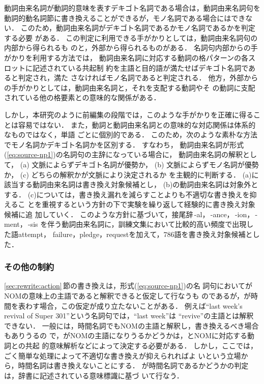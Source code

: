 動詞由来名詞が動詞的意味を表すデキゴト名詞である場合は，動詞由来名詞句を
動詞的動名詞節に書き換えることができるが，モノ名詞である場合にはできない．
このため，動詞由来名詞がデキゴト名詞であるかモノ名詞であるかを判定する必要
がある．
この判定に利用できる手がかりとしては，動詞由来名詞句の内部から得られるも
のと，外部から得られるものがある．
名詞句内部からの手がかりを利用する方法\cite{Hull96}では，
動詞由来名詞に対応する動詞の格パターンの各スロットに記述されている共起制
約を主語\NP と目的語\NPpost が満たせばデキゴト名詞であると判定され，満た
さなければモノ名詞であると判定される．
他方，外部からの手がかりとしては，動詞由来名詞と，それを支配する動詞やそ
の動詞に支配されている他の格要素との意味的な関係がある\cite{Vendler67}． 

しかし，本研究のように前編集の段階では，このような手がかりを正確に得るこ
とは容易ではない．
また，動詞と動詞由来名詞との意味的な対応関係は体系的なものではなく，単語
ごとに個別的である\cite{Ota74}．
このため，次のような素朴な方法でモノ名詞かデキゴト名詞かを区別する．
すなわち，
動詞由来名詞が形式(\ref{eq:source-np1})の名詞句の主辞になっている場合に，
動詞由来名詞の解釈として，
(a) 文脈によらずデキゴト名詞が優勢か，
(b) 文脈によらずモノ名詞が優勢か，
(c) どちらの解釈かが文脈により決定されるか
を主観的に判断する．
(a)に該当する動詞由来名詞は書き換え対象候補とし，
(b)の動詞由来名詞は対象外とする．
(c)については，書き換え漏れを減らすことよりも不適切な書き換えを抑えるこ
とを重視するという方針の下で実験を繰り返して経験的に書き換え対象候補に追
加していく．
このような方針に基づいて，接尾辞\,-al，\,-ance，\,-ion，\,-ment，\,-sis
を伴う動詞由来名詞に，訓練文集において比較的高い頻度で出現した語attempt，
failure，pledge，requestを加えて，786語を書き換え対象候補とした． 

\subsubsection{その他の制約}
\label{sec:rewrite:cond:etc}

\ref{sec:rewrite:action}\,節の書き換えは，形式(\ref{eq:source-np1})の名
詞句において\NP がNOMの意味上の主語であると解釈できると仮定して行なうも
のであるが，\NP が時間を表わす場合，この仮定が成り立たないことがある．
例えば``last week's revival of Super 301''という名詞句では，``last week''は
``revive''の主語とは解釈できない．
一般には，時間名詞でもNOMの主語と解釈し，書き換えるべき場合もありうるの
で，\NP がNOMの主語になりうるかどうかは，\NP とNOMに対応する動詞との共起
的意味解析などによって決定する必要がある．
しかし，ここでは，ごく簡単な処理によって不適切な書き換えが抑えられればよ
いという立場から，時間名詞は書き換えないことにする． 
\NP が時間名詞であるかどうかの判定は，辞書に記述されている意味標識に基づ
いて行なう．

